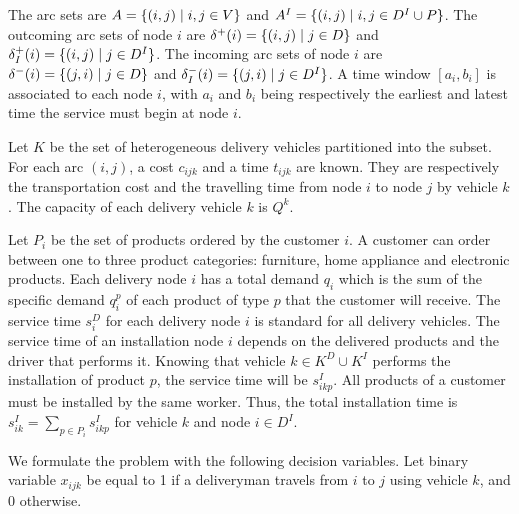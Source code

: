 \documentclass{article}
\begin{document}
{The arc sets are $A = \{(i, j) \hspace*{1mm} \vert \hspace*{1mm} i, j \in V \}$ and $A^I = \{(i, j) \hspace*{1mm} \vert \hspace*{1mm} i, j \in D^I \cup P\}$. The outcoming arc sets of node $i$ are $\delta^{+}(i) = \{(i, j) \hspace*{1mm} \vert \hspace*{1mm}  j \in D \}$ and $\delta^{+}_I(i) = \{(i, j) \hspace*{1mm} \vert \hspace*{1mm}  j \in D^I \}$. The incoming arc sets of node $i$ are $\delta^{-}(i) = \{(j, i) \hspace*{1mm} \vert \hspace*{1mm}  j \in D \}$ and $\delta^{-}_I(i) = \{(j, i) \hspace*{1mm} \vert \hspace*{1mm} j \in D^I \}$. A time window $[a_{i},b_{i}]$ is associated to each node $i$, with $a_{i}$ and $b_{i}$ being respectively the earliest and latest time the service must begin at node $i$.

Let $K$ be the set of heterogeneous delivery vehicles partitioned into the subset. For each arc $(i,j)$, a cost $c_{ijk}$ and a time $t_{ijk}$ are known. They are respectively the transportation cost and the travelling time from node $i$ to node $j$ by vehicle $k$.  The capacity of each delivery vehicle $k$ is $Q^k$.

Let $P_i$ be the set of products ordered by the customer $i$. A customer can order between one to three product categories: furniture, home appliance and electronic products. Each delivery node $i$ has a total demand $q_{i}$ which is the sum of the specific demand $q^{p}_{i} $ of each product of type $p$ that the customer will receive. The service time $s_{i}^{D}$ for each delivery node $i$ is standard for all delivery vehicles. The service time of an installation node $i$ depends on the delivered products and the driver that performs it. Knowing that vehicle $k \in K^D \cup K^I$ performs the installation of product $p$, the service time will be $s_{ikp}^{I}$. All products of a customer must be installed by the same worker. Thus, the total installation time is $s_{ik}^{I} = \sum_{p \in P_i} s_{ikp}^{I}$ for vehicle $k$ and node $i \in D^I$.

We formulate the problem with the following decision variables. Let binary variable $x_{ijk}$ be equal to 1 if a deliveryman travels from $i$ to $j$ using vehicle $k$, and 0 otherwise.

}
\end{document}
